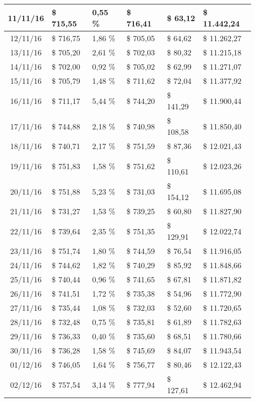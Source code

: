 \begin{small}
\begin{longtable}{|c|l|l|l|l|l|}
11/11/16 & \$ 715,55 & 0,55 \% & \$ 716,41 & \$ 63,12 & \$ 11.442,24 \\ \hline
12/11/16 & \$ 716,75 & 1,86 \% & \$ 705,05 & \$ 64,62 & \$ 11.262,27 \\ \hline
13/11/16 & \$ 705,20 & 2,61 \% & \$ 702,03 & \$ 80,32 & \$ 11.215,18 \\ \hline
14/11/16 & \$ 702,00 & 0,92 \% & \$ 705,02 & \$ 62,99 & \$ 11.271,07 \\ \hline
15/11/16 & \$ 705,79 & 1,48 \% & \$ 711,62 & \$ 72,04 & \$ 11.377,92 \\ \hline
16/11/16 & \$ 711,17 & 5,44 \% & \$ 744,20 & \$ 141,29 & \$ 11.900,44 \\ \hline
17/11/16 & \$ 744,88 & 2,18 \% & \$ 740,98 & \$ 108,58 & \$ 11.850,40 \\ \hline
18/11/16 & \$ 740,71 & 2,17 \% & \$ 751,59 & \$ 87,36 & \$ 12.021,43 \\ \hline
19/11/16 & \$ 751,83 & 1,58 \% & \$ 751,62 & \$ 110,61 & \$ 12.023,26 \\ \hline
20/11/16 & \$ 751,88 & 5,23 \% & \$ 731,03 & \$ 154,12 & \$ 11.695,08 \\ \hline
21/11/16 & \$ 731,27 & 1,53 \% & \$ 739,25 & \$ 60,80 & \$ 11.827,90 \\ \hline
22/11/16 & \$ 739,64 & 2,35 \% & \$ 751,35 & \$ 129,91 & \$ 12.022,74 \\ \hline
23/11/16 & \$ 751,74 & 1,80 \% & \$ 744,59 & \$ 76,54 & \$ 11.916,05 \\ \hline
24/11/16 & \$ 744,62 & 1,82 \% & \$ 740,29 & \$ 85,92 & \$ 11.848,66 \\ \hline
25/11/16 & \$ 740,44 & 0,96 \% & \$ 741,65 & \$ 67,81 & \$ 11.871,82 \\ \hline
26/11/16 & \$ 741,51 & 1,72 \% & \$ 735,38 & \$ 54,96 & \$ 11.772,90 \\ \hline
27/11/16 & \$ 735,44 & 1,08 \% & \$ 732,03 & \$ 52,60 & \$ 11.720,65 \\ \hline
28/11/16 & \$ 732,48 & 0,75 \% & \$ 735,81 & \$ 61,89 & \$ 11.782,63 \\ \hline
29/11/16 & \$ 736,33 & 0,40 \% & \$ 735,60 & \$ 68,51 & \$ 11.780,66 \\ \hline
30/11/16 & \$ 736,28 & 1,58 \% & \$ 745,69 & \$ 84,07 & \$ 11.943,54 \\ \hline
01/12/16 & \$ 746,05 & 1,64 \% & \$ 756,77 & \$ 80,46 & \$ 12.122,43 \\ \hline
02/12/16 & \$ 757,54 & 3,14 \% & \$ 777,94 & \$ 127,61 & \$ 12.462,94 \\ \hline

\end{longtable}
\end{small}
